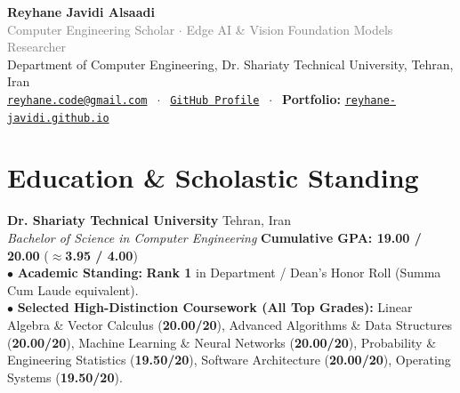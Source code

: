 \documentclass[10pt,a4paper]{article}
\begin{document}
\pagestyle{empty}

\begin{center}
    {\huge\bfseries \textcolor{dark}{Reyhane Javidi Alsaadi}}\\[4pt]
    \textcolor{gray}{Computer Engineering Scholar $\cdot$ Edge AI \& Vision Foundation Models Researcher}\\[3pt]
    Department of Computer Engineering, Dr. Shariaty Technical University, Tehran, Iran\\[3pt]
    \href{mailto:reyhane.code@gmail.com}{\texttt{reyhane.code@gmail.com}} $\;\cdot\;$ 
    \href{https://github.com}{\texttt{GitHub Profile}} $\;\cdot\;$
    \textbf{Portfolio:} \href{https://reyhane-javidi.github.io}{\texttt{reyhane-javidi.github.io}}
\end{center}

\vspace{-4pt}

\section{Education \& Scholastic Standing}
\textbf{Dr. Shariaty Technical University} \hfill Tehran, Iran\\
\textit{Bachelor of Science in Computer Engineering} \hfill \textbf{Cumulative GPA: 19.00 / 20.00} ($\approx$\textbf{3.95 / 4.00})\\
$\bullet$ \textbf{Academic Standing:} \textbf{Rank 1} in Department / Dean's Honor Roll (Summa Cum Laude equivalent).\\
$\bullet$ \textbf{Selected High-Distinction Coursework (All Top Grades):}
Linear Algebra \& Vector Calculus (\textbf{20.00/20}), Advanced Algorithms \& Data Structures (\textbf{20.00/20}), Machine Learning \& Neural Networks (\textbf{20.00/20}), Probability \& Engineering Statistics (\textbf{19.50/20}), Software Architecture (\textbf{20.00/20}), Operating Systems (\textbf{19.50/20}).

\end{document}
